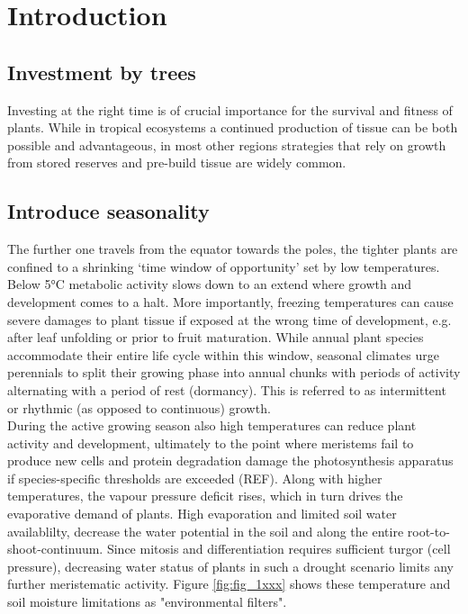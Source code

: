 \documentclass{article}
\begin{document}
\section*{Introduction}
	
	\subsection*{Investment by trees}
		Investing at the right time is of crucial importance for the survival and fitness of plants. While in tropical ecosystems a continued production of tissue can be both possible and advantageous, in most other regions strategies that rely on growth from stored reserves and pre-build tissue are widely common. 

	\subsection*{Introduce seasonality}
		The further one travels from the equator towards the poles, the tighter plants are confined to a shrinking ‘time window of opportunity’ set by low temperatures. Below 5°C  metabolic activity slows down to an extend where growth and development comes to a halt. More importantly, freezing temperatures can cause severe damages to plant tissue if exposed at the wrong time of development, e.g. after leaf unfolding or prior to fruit maturation. While annual plant species accommodate their entire life cycle within this window, seasonal climates urge perennials to split their growing phase into annual chunks with periods of activity alternating with a period of rest (dormancy). This is referred to as intermittent or rhythmic (as opposed to continuous) growth. \\
		
		During the active growing season also high temperatures can reduce plant activity and development, ultimately to the point where meristems fail to produce new cells and protein degradation damage the photosynthesis apparatus if species-specific thresholds are exceeded (REF). Along with higher temperatures, the vapour pressure deficit rises, which in turn drives the evaporative demand of plants. High evaporation and limited soil water availablilty, decrease the water potential in the soil and along the entire root-to-shoot-continuum. Since mitosis and differentiation requires sufficient turgor (cell pressure), decreasing water status of plants in such a drought scenario limits any further meristematic activity. Figure \ref{fig:fig_1xxx} shows these temperature and soil moisture limitations as "environmental filters". \\
		
\end{document}
